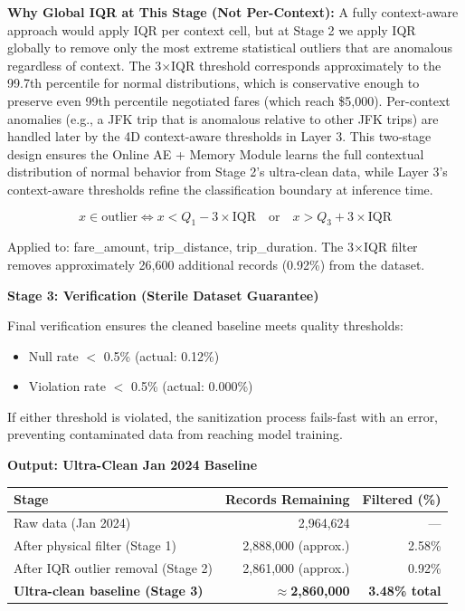 \textbf{Why Global IQR at This Stage (Not Per-Context):} A fully context-aware approach would apply IQR per context cell, but at Stage 2 we apply IQR globally to remove only the most extreme statistical outliers that are anomalous regardless of context. The 3$\times$IQR threshold corresponds approximately to the 99.7th percentile for normal distributions, which is conservative enough to preserve even 99th percentile negotiated fares (which reach \$5,000). Per-context anomalies (e.g., a JFK trip that is anomalous relative to other JFK trips) are handled later by the 4D context-aware thresholds in Layer 3. This two-stage design ensures the Online AE + Memory Module learns the full contextual distribution of normal behavior from Stage 2's ultra-clean data, while Layer 3's context-aware thresholds refine the classification boundary at inference time.

\begin{equation}
x \in \text{outlier} \iff x < Q_1 - 3 \times \mathrm{IQR} \quad \text{or} \quad x > Q_3 + 3 \times \mathrm{IQR}
\end{equation}

Applied to: fare\_amount, trip\_distance, trip\_duration. The 3$\times$IQR filter removes approximately 26,600 additional records (0.92\%) from the dataset.

\textbf{Stage 3: Verification (Sterile Dataset Guarantee)}

Final verification ensures the cleaned baseline meets quality thresholds:

\begin{itemize}
    \item Null rate $<$ 0.5\% (actual: 0.12\%)
    \item Violation rate $<$ 0.5\% (actual: 0.000\%)
\end{itemize}

If either threshold is violated, the sanitization process fails-fast with an error, preventing contaminated data from reaching model training.

\textbf{Output: Ultra-Clean Jan 2024 Baseline}

\begin{center}
\begin{tabular}{|l|r|r|}
\hline
\textbf{Stage} & \textbf{Records Remaining} & \textbf{Filtered (\%)} \\
\hline
Raw data (Jan 2024) & 2,964,624 & --- \\
After physical filter (Stage 1) & 2,888,000 (approx.) & 2.58\% \\
After IQR outlier removal (Stage 2) & 2,861,000 (approx.) & 0.92\% \\
\textbf{Ultra-clean baseline (Stage 3)} & \textbf{$\approx$2,860,000} & \textbf{3.48\% total} \\
\hline
\end{tabular}
\end{center}

